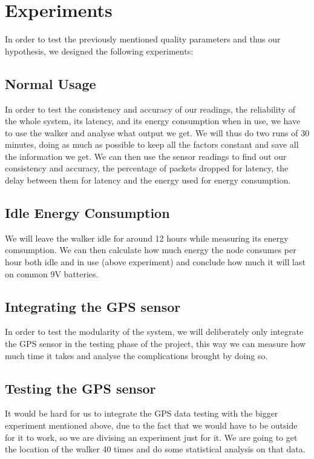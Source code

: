 \section{Experiments}
	In order to test the previously mentioned quality parameters and thus our hypothesis, we designed the following experiments:

	\subsection{Normal Usage}
		In order to test the consistency and accuracy of our readings, the reliability of the whole system, its latency, and its energy consumption when in use, we have to use the walker and analyse what output we get. We will thus do two runs of 30 minutes, doing as much as possible to keep all the factors constant and save all the information we get. We can then use the sensor readings to find out our consistency and accuracy, the percentage of packets dropped for latency, the delay between them for latency and the energy used for energy consumption.

	\subsection{Idle Energy Consumption}
		We will leave the walker idle for around 12 hours while measuring its energy comsumption.
		We can then calculate how much energy the node consumes per hour both idle and in use (above experiment) and conclude how much it will last on common 9V batteries.

	\subsection{Integrating the GPS sensor}
		In order to test the modularity of the system, we will deliberately only integrate the GPS sensor in the testing phase of the project, this way we can measure how much time it takes and analyse the complications brought by doing so.

	\subsection{Testing the GPS sensor}
		It would be hard for us to integrate the GPS data testing with the bigger experiment mentioned above, due to the fact that we would have to be outside for it to work, so we are divising an experiment just for it.
		We are going to get the location of the walker 40 times and do some statistical analysis on that data.

